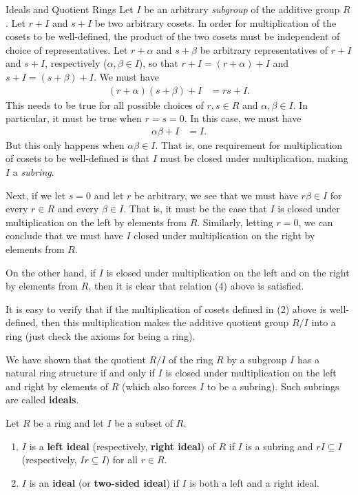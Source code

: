 \begin{section}{Ideals and Quotient Rings}
Let $I$ be an arbitrary \emph{subgroup} of the additive group $R$.  Let $r+I$ and $s+I$ be two arbitrary cosets.  In order for multiplication of the cosets to be well-defined, the product of the two cosets must be independent of choice of representatives.  Let $r+\alpha$ and $s+\beta$ be arbitrary representatives of $r+I$ and $s+I$, respectively ($\alpha,\beta\in I$), so that $r+I=(r+\alpha)+I$ and $s+I=(s+\beta)+I$.  We must have
\begin{align}
(r+\alpha)(s+\beta)+I & =rs+I.
\end{align}
This needs to be true for all possible choices of $r,s\in R$ and $\alpha, \beta\in I$.  In particular, it must be true when $r=s=0$.  In this case, we must have
\begin{align}
\alpha\beta+I & =I.
\end{align}
But this only happens when $\alpha\beta\in I$.  That is, one requirement for multiplication of cosets to be well-defined is that $I$ must be closed under multiplication, making $I$ a \emph{subring}.

Next, if we let $s=0$ and let $r$ be arbitrary, we see that we must have $r\beta\in I$ for every $r\in R$ and every $\beta\in I$.  That is, it must be the case that $I$ is closed under multiplication on the left by elements from $R$.  Similarly, letting $r=0$, we can conclude that we must have $I$ closed under multiplication on the right by elements from $R$.  

On the other hand, if $I$ is closed under multiplication on the left and on the right by elements from $R$, then it is clear that relation (4) above is satisfied.

It is easy to verify that if the multiplication of cosets defined in (2) above is well-defined, then this multiplication makes the additive quotient group $R/I$ into a ring (just check the axioms for being a ring).

We have shown that the quotient $R/I$ of the ring $R$ by a subgroup $I$ has a natural ring structure if and only if $I$ is closed under multiplication on the left and right by elements of $R$ (which also forces $I$ to be a subring).  Such subrings are called \textbf{ideals}.

\begin{definition}
Let $R$ be a ring and let $I$ be a subset of $R$.
\begin{enumerate}[label=\rm{(\alph*)}]
\item $I$ is a \textbf{left ideal} (respectively, \textbf{right ideal}) of $R$ if $I$ is a subring and $rI\subseteq I$ (respectively, $Ir\subseteq I$) for all $r\in R$.
\item $I$ is an \textbf{ideal} (or \textbf{two-sided ideal}) if $I$ is both a left and a right ideal.
\end{enumerate}
\end{definition}


\end{section}
